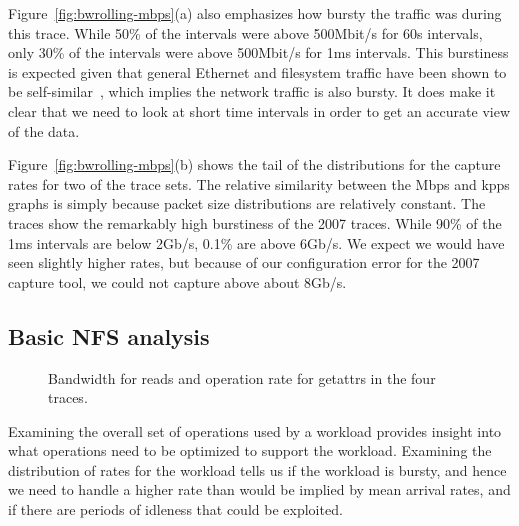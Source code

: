 Figure~\ref{fig:bwrolling-mbps}(a) also emphasizes how bursty the traffic was
during this trace. While 50\% of the intervals were above 500Mbit/s for
60s intervals, only 30\% of the intervals were above 500Mbit/s for 1ms
intervals.  This burstiness is expected given that
general Ethernet and filesystem
traffic have been shown to be
self-similar~\cite{Gribble98selfsimilar,Leland94selfsimilar}, which implies the network traffic is also bursty.
It does make it clear that we need to look at short time intervals in
order to get an accurate view of the data.

Figure~\ref{fig:bwrolling-mbps}(b) shows the tail of the distributions for
the capture rates for two of the trace sets.  The relative similarity
between the Mbps and kpps graphs is simply because packet size
distributions are relatively constant.  The traces show the remarkably high
burstiness of the 2007 traces.  While 90\% of the 1ms intervals are
below 2Gb/s, 0.1\% are above 6Gb/s.  We expect we would have seen
slightly higher rates, but because of our configuration error for the
2007 capture tool, we could not capture above about 8Gb/s.


\subsection{Basic NFS analysis}

\begin{figure}
\vspace{-0.1in}
\caption{Bandwidth for reads and operation rate for getattrs in the four traces.}
\label{fig:bw-ops-quantiles}
\end{figure}

Examining the overall set of operations used by a workload provides
insight into what operations need to be optimized to support the
workload.  Examining the distribution of rates for the workload tells
us if the workload is bursty, and hence we need to handle a higher
rate than would be implied by mean arrival rates, and if there are
periods of idleness that could be exploited.

